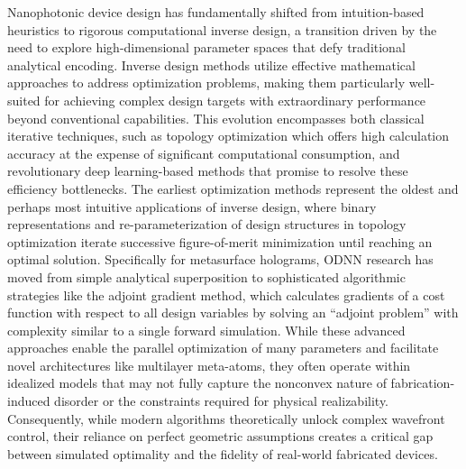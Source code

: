 Nanophotonic device design has fundamentally shifted from intuition-based heuristics to rigorous computational inverse design, a transition driven by the need to explore high-dimensional parameter spaces that defy traditional analytical encoding. Inverse design methods utilize effective mathematical approaches to address optimization problems, making them particularly well-suited for achieving complex design targets with extraordinary performance beyond conventional capabilities. This evolution encompasses both classical iterative techniques, such as topology optimization which offers high calculation accuracy at the expense of significant computational consumption, and revolutionary deep learning-based methods that promise to resolve these efficiency bottlenecks. The earliest optimization methods represent the oldest and perhaps most intuitive applications of inverse design, where binary representations and re-parameterization of design structures in topology optimization iterate successive figure-of-merit minimization until reaching an optimal solution. Specifically for metasurface holograms, ODNN research has moved from simple analytical superposition to sophisticated algorithmic strategies like the adjoint gradient method, which calculates gradients of a cost function with respect to all design variables by solving an ``adjoint problem'' with complexity similar to a single forward simulation. \citep{doi_10_48550_arxiv_2603_15210_fdcfb92f} \citep{doi_10_1038_s41598_024_67142_2_db612126} While these advanced approaches enable the parallel optimization of many parameters and facilitate novel architectures like multilayer meta-atoms, they often operate within idealized models that may not fully capture the nonconvex nature of fabrication-induced disorder or the constraints required for physical realizability. Consequently, while modern algorithms theoretically unlock complex wavefront control, their reliance on perfect geometric assumptions creates a critical gap between simulated optimality and the fidelity of real-world fabricated devices. \citep{doi_10_1088_1361_6439_ad3a72_72d60f33} \citep{doi_10_1364_oe_27_030308_704a1c9b} \citep{s2_76a83ea3baed75ad88b7f0782eb9a694a330c853_cee16cac} \citep{doi_10_1515_nanoph_2021_0660_2d91a441}

